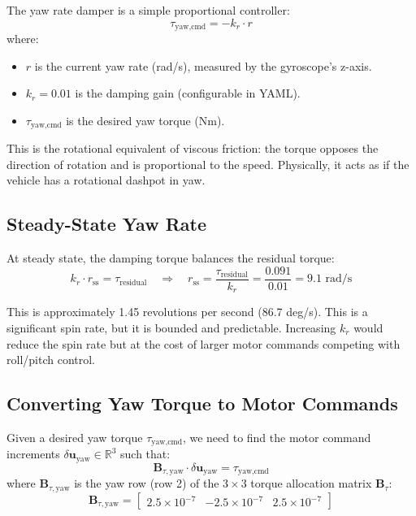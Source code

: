 \documentclass[12pt, a4paper]{article}
\newcommand{\R}{\mathbb{R}}
\newcommand{\bu}{\bm{u}}
\newcommand{\bB}{\bm{B}}
\begin{document}
The yaw rate damper is a simple proportional controller:
\begin{equation}
    \tau_{\text{yaw,cmd}} = -k_r \cdot r
\end{equation}
where:
\begin{itemize}
    \item $r$ is the current yaw rate (rad/s), measured by the gyroscope's z-axis.
    \item $k_r = 0.01$ is the damping gain (configurable in YAML).
    \item $\tau_{\text{yaw,cmd}}$ is the desired yaw torque (Nm).
\end{itemize}

This is the rotational equivalent of viscous friction: the torque opposes the direction of rotation and is proportional to the speed.  Physically, it acts as if the vehicle has a rotational dashpot in yaw.

\subsection{Steady-State Yaw Rate}

At steady state, the damping torque balances the residual torque:
\begin{equation}
    k_r \cdot r_{\text{ss}} = \tau_{\text{residual}} \quad \Rightarrow \quad r_{\text{ss}} = \frac{\tau_{\text{residual}}}{k_r} = \frac{0.091}{0.01} = 9.1 \text{ rad/s}
\end{equation}

This is approximately 1.45 revolutions per second (86.7 deg/s).  This is a significant spin rate, but it is bounded and predictable.  Increasing $k_r$ would reduce the spin rate but at the cost of larger motor commands competing with roll/pitch control.

\subsection{Converting Yaw Torque to Motor Commands}

Given a desired yaw torque $\tau_{\text{yaw,cmd}}$, we need to find the motor command increments $\delta \bu_{\text{yaw}} \in \R^3$ such that:
\begin{equation}
    \bB_{\tau,\text{yaw}} \cdot \delta \bu_{\text{yaw}} = \tau_{\text{yaw,cmd}}
\end{equation}
where $\bB_{\tau,\text{yaw}}$ is the yaw row (row 2) of the $3 \times 3$ torque allocation matrix $\bB_\tau$:
\begin{equation}
    \bB_{\tau,\text{yaw}} = \begin{bmatrix} 2.5 \times 10^{-7} & -2.5 \times 10^{-7} & 2.5 \times 10^{-7} \end{bmatrix}
\end{equation}
\end{document}
